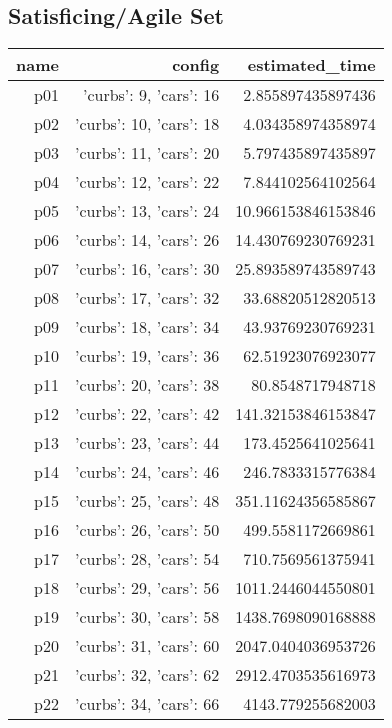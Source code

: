 \documentclass{article}
\begin{document}
                                \subsection*{Satisficing/Agile Set}
                                
                            \begin{center}
                            \scriptsize
                            \begin{tabular}{r|r|r}
                            name & config & estimated\_time\\\midrule
                              p01&{'curbs': 9, 'cars': 16}&2.855897435897436\\
  p02&{'curbs': 10, 'cars': 18}&4.034358974358974\\
  p03&{'curbs': 11, 'cars': 20}&5.797435897435897\\
  p04&{'curbs': 12, 'cars': 22}&7.844102564102564\\
  p05&{'curbs': 13, 'cars': 24}&10.966153846153846\\
  p06&{'curbs': 14, 'cars': 26}&14.430769230769231\\
  p07&{'curbs': 16, 'cars': 30}&25.893589743589743\\
  p08&{'curbs': 17, 'cars': 32}&33.68820512820513\\
  p09&{'curbs': 18, 'cars': 34}&43.93769230769231\\
  p10&{'curbs': 19, 'cars': 36}&62.51923076923077\\
  p11&{'curbs': 20, 'cars': 38}&80.8548717948718\\
  p12&{'curbs': 22, 'cars': 42}&141.32153846153847\\
  p13&{'curbs': 23, 'cars': 44}&173.4525641025641\\
  p14&{'curbs': 24, 'cars': 46}&246.7833315776384\\
  p15&{'curbs': 25, 'cars': 48}&351.11624356585867\\
  p16&{'curbs': 26, 'cars': 50}&499.5581172669861\\
  p17&{'curbs': 28, 'cars': 54}&710.7569561375941\\
  p18&{'curbs': 29, 'cars': 56}&1011.2446044550801\\
  p19&{'curbs': 30, 'cars': 58}&1438.7698090168888\\
  p20&{'curbs': 31, 'cars': 60}&2047.0404036953726\\
  p21&{'curbs': 32, 'cars': 62}&2912.4703535616973\\
  p22&{'curbs': 34, 'cars': 66}&4143.779255682003\\

\end{tabular}
\end{center}
\end{document}
